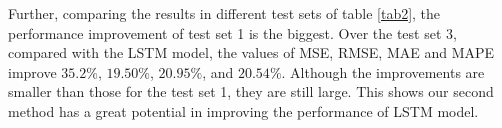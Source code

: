 





Further, comparing the results in different test sets of table \ref{tab2}, the performance improvement of test set 1 is  the biggest. Over the test set 3,  compared with the LSTM model, the values of MSE, RMSE, MAE and MAPE  improve  $35.2\%$, $19.50\%$, $20.95\%$, and $20.54\%$.  Although the improvements are smaller than those for the test set 1, they are still large. This shows our second method has a  great potential in improving the performance of LSTM model. %


